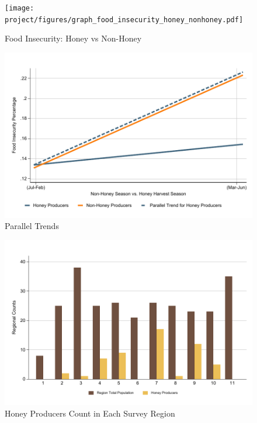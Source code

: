 \documentclass[../main.tex]{subfiles}
\begin{document}
\begin{figure}[h!]
    \centering
    \caption{Food Insecurity: Honey vs Non-Honey}
    \label{fig:graph_food_insecurity_honey_nonhoney}    \texttt{[image: project/figures/graph\_food\_insecurity\_honey\_nonhoney.pdf]}
\end{figure}






\begin{figure}[h!]
    \centering
    \caption{Parallel Trends}
    \label{fig:graph_parallel_trends}    \includegraphics[width=1\textwidth]{project/figures/pdf/graph_parallel_trends.pdf}
\end{figure}






\begin{figure}[h!]
    \centering
    \caption{Honey Producers Count in Each Survey Region}
    \label{fig:graph_honey_regional_counts}    \includegraphics[width=1\textwidth]{project/figures/pdf/graph_honey_regional_counts.pdf}

\end{figure}
\end{document}
